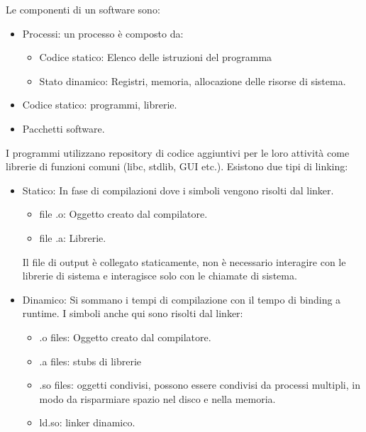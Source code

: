 \documentclass{article}
\begin{document}
		Le componenti di un software sono:
		\begin{itemize}
		    \item Processi: un processo è composto da:
		    \begin{itemize}
		        \item Codice statico: Elenco delle istruzioni del programma
		        \item Stato dinamico: Registri, memoria, allocazione delle risorse di sistema.
		    \end{itemize}
		    \item Codice statico: programmi, librerie.
		    \item Pacchetti software.
		\end{itemize}
		I programmi utilizzano repository di codice aggiuntivi per le loro attività come librerie di funzioni comuni (libc, stdlib, GUI etc.).
		Esistono due tipi di linking:
		\begin{itemize}
		    \item Statico: In fase di compilazioni dove i simboli vengono risolti dal linker. 
		    \begin{itemize}
		        \item file .o: Oggetto creato dal compilatore.
		        \item file .a: Librerie.
		    \end{itemize}
		    Il file di output è collegato staticamente, non è necessario interagire con le librerie di sistema e interagisce solo con le chiamate di sistema.
		    \item Dinamico: Si sommano i tempi di compilazione con il tempo di binding a runtime.
		    I simboli anche qui sono risolti dal linker:
		    \begin{itemize}
		        \item .o files: Oggetto creato dal compilatore.
		        \item .a files: stubs di librerie
		        \item .so files: oggetti condivisi, possono essere condivisi da processi multipli, in modo da risparmiare spazio nel disco e nella memoria.
		        \item ld.so: linker dinamico.
		    \end{itemize}
		\end{itemize}
\end{document}
